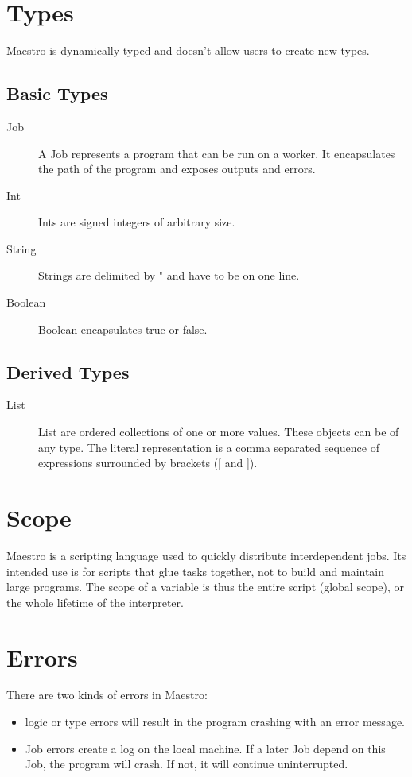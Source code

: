\section{Types}
Maestro is dynamically typed and doesn't allow users to create new types.
\subsection{Basic Types}
\begin{description}
  \item[Job] A Job represents a program that can be run on a worker. It
   encapsulates the path of the program and exposes outputs and errors.
  \item[Int] Ints are signed integers of arbitrary size.
  \item[String] Strings are delimited by " and have to be on one line.
  \item[Boolean] Boolean encapsulates true or false.
\end{description}

\subsection{Derived Types}
\begin{description}
  \item[List] List are ordered collections of one or more values. These
    objects can be of any type. The literal representation is a
    comma separated sequence of expressions surrounded by brackets ([ and ]).
\end{description}

\section{Scope}
Maestro is a scripting language used to quickly distribute interdependent jobs.
Its intended use is for scripts that glue tasks together, not to build and
maintain large programs. The scope of a variable is thus the entire script
(global scope), or the whole lifetime of the interpreter.

\section{Errors}
There are two kinds of errors in Maestro:
\begin{itemize}
  \item logic or type errors will result in the program crashing with an error
  message.
  \item Job errors create a log on the local machine. If a later Job depend
  on this Job, the program will crash. If not, it will continue uninterrupted.
\end{itemize}

